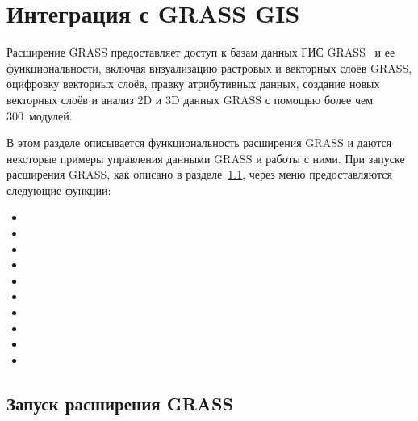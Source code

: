 
\chapter{Интеграция с GRASS GIS}\label{sec:grass}


Расширение GRASS предоставляет доступ к базам данных ГИС GRASS~\cite{GRASSweb}
и ее функциональности, включая визуализацию растровых и векторных слоёв
GRASS, оцифровку векторных слоёв, правку атрибутивных данных,
создание новых векторных слоёв и анализ 2D и 3D данных GRASS с помощью
более чем 300~модулей.

В этом разделе описывается функциональность расширения GRASS и даются
некоторые примеры управления данными GRASS и работы с ними. При запуске
расширения GRASS, как описано в разделе~\ref{sec:starting_grass},
через меню предоставляются следующие функции:

\begin{itemize}[label=--]
\item {}
\item {}
\item {}
\item {}
\item {}
\item {}
\item {}
\item {}
\item {}
\item {}
\end{itemize}

\section{Запуск расширения GRASS}\label{sec:starting_grass}

